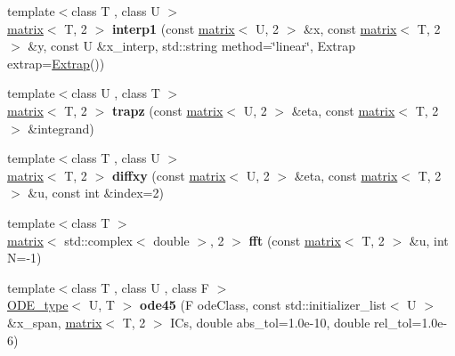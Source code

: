 \begin{DoxyCompactItemize}
\item 
\hypertarget{namespacekeycpp_aa379fd1b7ae981ede575baf357c18302}{{\footnotesize template$<$class T , class U $>$ }\\\hyperlink{classkeycpp_1_1matrix}{matrix}$<$ T, 2 $>$ {\bfseries interp1} (const \hyperlink{classkeycpp_1_1matrix}{matrix}$<$ U, 2 $>$ \&x, const \hyperlink{classkeycpp_1_1matrix}{matrix}$<$ T, 2 $>$ \&y, const U \&x\-\_\-interp, std\-::string method=\char`\"{}linear\char`\"{}, Extrap extrap=\hyperlink{classkeycpp_1_1_extrap}{Extrap}())}\label{namespacekeycpp_aa379fd1b7ae981ede575baf357c18302}

\item 
\hypertarget{namespacekeycpp_ac9e68fc6f023bc2634c3a6f1ddb7e6b8}{{\footnotesize template$<$class U , class T $>$ }\\\hyperlink{classkeycpp_1_1matrix}{matrix}$<$ T, 2 $>$ {\bfseries trapz} (const \hyperlink{classkeycpp_1_1matrix}{matrix}$<$ U, 2 $>$ \&eta, const \hyperlink{classkeycpp_1_1matrix}{matrix}$<$ T, 2 $>$ \&integrand)}\label{namespacekeycpp_ac9e68fc6f023bc2634c3a6f1ddb7e6b8}

\item 
\hypertarget{namespacekeycpp_adbb28bb59e9e552598c05ebe9d1af397}{{\footnotesize template$<$class T , class U $>$ }\\\hyperlink{classkeycpp_1_1matrix}{matrix}$<$ T, 2 $>$ {\bfseries diffxy} (const \hyperlink{classkeycpp_1_1matrix}{matrix}$<$ U, 2 $>$ \&eta, const \hyperlink{classkeycpp_1_1matrix}{matrix}$<$ T, 2 $>$ \&u, const int \&index=2)}\label{namespacekeycpp_adbb28bb59e9e552598c05ebe9d1af397}

\item 
\hypertarget{namespacekeycpp_a1fcfb748997291434fe9db7dbffd8c6f}{{\footnotesize template$<$class T $>$ }\\\hyperlink{classkeycpp_1_1matrix}{matrix}$<$ std\-::complex$<$ double $>$, 2 $>$ {\bfseries fft} (const \hyperlink{classkeycpp_1_1matrix}{matrix}$<$ T, 2 $>$ \&u, int N=-\/1)}\label{namespacekeycpp_a1fcfb748997291434fe9db7dbffd8c6f}

\item 
\hypertarget{namespacekeycpp_a6d7114f640a4a253a1d50ffc810bdad0}{{\footnotesize template$<$class T , class U , class F $>$ }\\\hyperlink{structkeycpp_1_1_o_d_e__type}{O\-D\-E\-\_\-type}$<$ U, T $>$ {\bfseries ode45} (F ode\-Class, const std\-::initializer\-\_\-list$<$ U $>$ \&x\-\_\-span, \hyperlink{classkeycpp_1_1matrix}{matrix}$<$ T, 2 $>$ I\-Cs, double abs\-\_\-tol=1.\-0e-\/10, double rel\-\_\-tol=1.\-0e-\/6)}\label{namespacekeycpp_a6d7114f640a4a253a1d50ffc810bdad0}


\end{DoxyCompactItemize}
